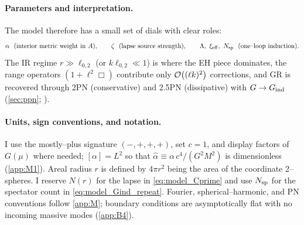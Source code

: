 \documentclass{iopjournal}
\begin{document}
\paragraph{Parameters and interpretation.}
The model therefore has a small set of dials with clear roles:
\[
\alpha\ \ (\text{interior metric weight in }A),\qquad
\zeta\ \ (\text{lapse source strength}),\qquad
\Lambda,\ \xi_{\rm eff},\ N_{\rm sp}\ \ (\text{one–loop induction}).
\]
The IR regime $r\gg \ell_{0,2}$ (or $k\ell_{0,2}\ll1$) is where the EH piece dominates, the range operators $(1+\ell^2\Box)$ contribute only $\order{(\ell k)^2}$ corrections, and GR is recovered through 2PN (conservative) and 2.5PN (dissipative) with $G\to G_{\rm ind}$ (\cref{sec:ppn}; ).

\paragraph{Units, sign conventions, and notation.}
I use the mostly–plus signature $(-,+,+,+)$, set $c=1$, and display factors of $G(\mu)$ where needed; $[\alpha]=L^{2}$ so that $\widehat\alpha\equiv \alpha\,c^{4}/(G^{2}M^{2})$ is dimensionless (\cref{app:M1}). Areal radius $r$ is defined by $4\pi r^2$ being the area of the coordinate 2–spheres. I reserve $N(r)$ for the lapse in \eqref{eq:model_Cprime} and use $N_{\rm sp}$ for the spectator count in \eqref{eq:model_Gind_repeat}. Fourier, spherical–harmonic, and PN conventions follow \cref{app:M}; boundary conditions are asymptotically flat with no incoming massive modes (\cref{app:B4}).


















































\newpage
 

\end{document}
